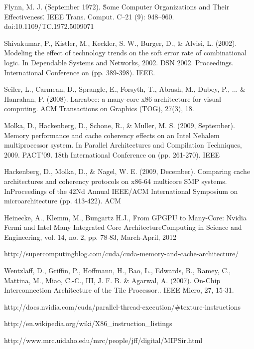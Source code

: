 \begin{thebibliography}{99}
Flynn, M. J. (September 1972). \"Some Computer Organizations and Their Effectiveness\". IEEE Trans. Comput. C–21 (9): 948–960. doi:10.1109/TC.1972.5009071

 Shivakumar, P., Kistler, M., Keckler, S. W., Burger, D., \& Alvisi, L. (2002). Modeling the effect of technology trends on the soft error rate of combinational logic. In Dependable Systems and Networks, 2002. DSN 2002. Proceedings. International Conference on (pp. 389-398). IEEE.

 Seiler, L., Carmean, D., Sprangle, E., Forsyth, T., Abrash, M., Dubey, P., ... \& Hanrahan, P. (2008). Larrabee: a many-core x86 architecture for visual computing. ACM Transactions on Graphics (TOG), 27(3), 18.

 Molka, D., Hackenberg, D., Schone, R., \& Muller, M. S. (2009, September). Memory performance and cache coherency effects on an Intel Nehalem multiprocessor system. In Parallel Architectures and Compilation Techniques, 2009. PACT'09. 18th International Conference on (pp. 261-270). IEEE

 Hackenberg, D., Molka, D., \& Nagel, W. E. (2009, December). Comparing cache architectures and coherency protocols on x86-64 multicore SMP systems. InProceedings of the 42Nd Annual IEEE/ACM International Symposium on microarchitecture (pp. 413-422). ACM

 Heinecke, A., Klemm, M., Bungartz H.J., \"From GPGPU to Many-Core: Nvidia Fermi and Intel Many Integrated Core Architecture\" Computing in Science and Engineering, vol. 14, no. 2, pp. 78-83, March-April, 2012 

 http://supercomputingblog.com/cuda/cuda-memory-and-cache-architecture/

 Wentzlaff, D., Griffin, P., Hoffmann, H., Bao, L., Edwards, B., Ramey, C., Mattina, M., Miao, C.-C., III, J. F. B. \& Agarwal, A. (2007). On-Chip Interconnection Architecture of the Tile Processor.. IEEE Micro, 27, 15-31. 

 http://docs.nvidia.com/cuda/parallel-thread-execution/\#texture-instructions

 http://en.wikipedia.org/wiki/X86\_instruction\_listings

 http://www.mrc.uidaho.edu/mrc/people/jff/digital/MIPSir.html


\end{thebibliography}
